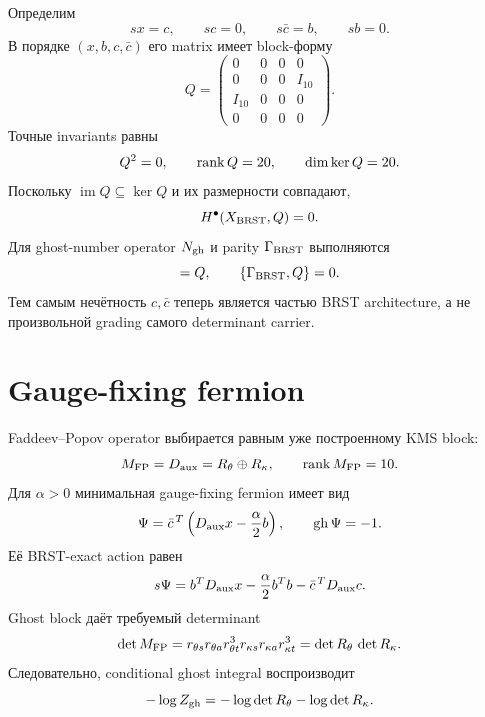 Определим
\begin{equation}
 sx=c,\qquad sc=0,\qquad s\bar c=b,\qquad sb=0.
 \label{eq:v9-kms-brst-differential}
\end{equation}
В порядке $(x,b,c,\bar c)$ его matrix имеет block-форму
\begin{equation}
 Q=
 \begin{pmatrix}
 0&0&0&0\\
 0&0&0&I_{10}\\
 I_{10}&0&0&0\\
 0&0&0&0
 \end{pmatrix}.
 \label{eq:v9-kms-brst-matrix}
\end{equation}
Точные invariants равны
\begin{equation}
 Q^2=0,\qquad
 \operatorname{rank} Q=20,\qquad
 \dim\ker Q=20.
 \label{eq:v9-kms-brst-rank-nullity}
\end{equation}
Поскольку $\operatorname{im}Q\subseteq\ker Q$ и их размерности совпадают,
\begin{equation}
 H^\bullet(X_{\rm BRST},Q)=0.
 \label{eq:v9-kms-brst-zero-cohomology}
\end{equation}
Для ghost-number operator $N_{\rm gh}$ и parity $\Gamma_{\rm BRST}$
выполняются
\begin{equation}
 [N_{\rm gh},Q]=Q,
 \qquad
 \{\Gamma_{\rm BRST},Q\}=0.
 \label{eq:v9-kms-brst-degree-parity}
\end{equation}
Тем самым нечётность $c,\bar c$ теперь является частью BRST architecture,
а не произвольной grading самого determinant carrier.

\section{Gauge-fixing fermion}

Faddeev--Popov operator выбирается равным уже построенному KMS block:
\begin{equation}
 M_{\rm FP}=D_{\rm aux}=R_\theta\oplus R_\kappa,
 \qquad \operatorname{rank} M_{\rm FP}=10.
 \label{eq:v9-kms-brst-fp-operator}
\end{equation}
Для $\alpha>0$ минимальная gauge-fixing fermion имеет вид
\begin{equation}
 \Psi=\bar c^{\,T}\left(D_{\rm aux}x-\frac{\alpha}{2}b\right),
 \qquad \operatorname{gh}\Psi=-1.
 \label{eq:v9-kms-brst-gauge-fermion}
\end{equation}
Её BRST-exact action равен
\begin{equation}
 s\Psi=
 b^T D_{\rm aux}x-\frac{\alpha}{2}b^Tb
 -\bar c^{\,T}D_{\rm aux}c.
 \label{eq:v9-kms-brst-exact-action}
\end{equation}
Ghost block даёт требуемый determinant
\begin{equation}
 \det M_{\rm FP}
 =r_{\theta s}r_{\theta a}r_{\theta t}^3
  r_{\kappa s}r_{\kappa a}r_{\kappa t}^3
 =\det R_\theta\,\det R_\kappa.
 \label{eq:v9-kms-brst-fp-determinant}
\end{equation}
Следовательно, conditional ghost integral воспроизводит
\begin{equation}
 -\log Z_{\rm gh}
 =-\log\det R_\theta-\log\det R_\kappa.
 \label{eq:v9-kms-brst-effective-logdet}
\end{equation}

